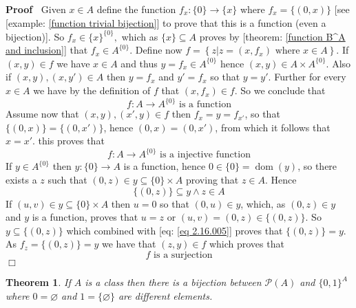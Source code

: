 \documentclass{book}
\newcommand{\tmop}[1]{\ensuremath{\operatorname{#1}}}
\newenvironment{proof}{\noindent\textbf{Proof\ }}{\hspace*{\fill}$\Box$\medskip}
\newtheorem{theorem}{Theorem}
\begin{document}
\begin{proof}
  Given $x \in A$ define the function $f_x : \{ 0 \} \rightarrow \{ x \}$
  where $f_x = \{ (0, x) \}$ [see [example: \ref{function trivial bijection}]
  to prove that this is a function (even a bijection)]. So $f_x \in \{ x
  \}^{\{ 0 \}},$ which as $\{ x \} \subseteq A$ proves by [theorem:
  \ref{function B^A and inclusion}] that $f_x \in A^{\{ 0 \}}$. Define now $f
  = \left\{ z|z = (x, f_x) \text{ where } x \in A \right\}$. If $(x, y) \in f$
  we have $x \in A$ and thus $y = f_x \in A^{\{ 0 \}}$ hence $(x, y) \in A
  \times A^{\{ 0 \}}$. Also if $(x, y), (x, y') \in A$ then $y = f_x$ and $y'
  = f_x$ so that $y = y'$. Further for every $x \in A$ we have by the
  definition of $f$ that $(x, f_x) \in f$. So we conclude that
  \[ f : A \rightarrow A^{\{ 0 \}} \text{ is a function} \]
  Assume now that $(x, y), (x', y) \in f$ then $f_x = y = f_{x'}$, so that $\{
  (0, x) \} = \{ (0, x') \}$, hence $(0, x) = (0, x')$, from which it follows
  that $x = x'$. this proves that
  \[ f : A \rightarrow A^{\{ 0 \}} \text{ is a injective function} \]
  If $y \in A^{\{ 0 \}}$ then $y : \{ 0 \} \rightarrow A$ is a function, hence
  $0 \in \{ 0 \} = \tmop{dom} (y)$, so there exists a $z$ such that $(0, z)
  \in y \subseteq \{ 0 \} \times A$ proving that $z \in A$. Hence
  \begin{equation}
    \label{eq 2.16.005} \{ (0, z) \} \subseteq y \wedge z \in A \text{}
  \end{equation}
  If $(u, v) \in y \subseteq \{ 0 \} \times A$ then $u = 0$ so that $(0, u)
  \in y$, which, as $(0, z) \in y$ and $y$ is a function, proves that $u = z$
  or $(u, v) = (0, z) \in \{ (0, z) \}$. So $y \subseteq \{ (0, z) \}$ which
  combined with [eq: \ref{eq 2.16.005}] proves that $\{ (0, z) \} = y$. As
  $f_z = \{ (0, z) \} = y$ we have that $(z, y) \in f$ which proves that
  \[ f \text{ is a surjection} \]
\end{proof}

\begin{theorem}
  \label{function P(A)=2^A}If $A$ is a class then there is a bijection between
  $\mathcal{P} (A)$ and $\{ 0, 1 \}^A$ where $0 = \varnothing$ and $1 = \{
  \varnothing \}$ are different elements.
\end{theorem}
\end{document}
